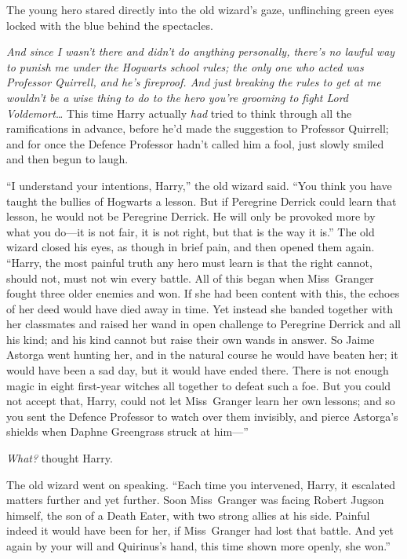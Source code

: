 The young hero stared directly into the old wizard’s gaze, unflinching green eyes locked with the blue behind the spectacles.

\emph{And since I wasn’t there and didn’t do anything personally, there’s no lawful way to punish me under the Hogwarts school rules; the only one who acted was Professor Quirrell, and he’s fireproof. And just breaking the rules to get at me wouldn’t be a wise thing to do to the hero you’re grooming to fight Lord Voldemort…} This time Harry actually \emph{had} tried to think through all the ramifications in advance, before he’d made the suggestion to Professor Quirrell; and for once the Defence Professor hadn’t called him a fool, just slowly smiled and then begun to laugh.

“I understand your intentions, Harry,” the old wizard said. “You think you have taught the bullies of Hogwarts a lesson. But if Peregrine Derrick could learn that lesson, he would not be Peregrine Derrick. He will only be provoked more by what you do—it is not fair, it is not right, but that is the way it is.” The old wizard closed his eyes, as though in brief pain, and then opened them again. “Harry, the most painful truth any hero must learn is that the right cannot, should not, must not win every battle. All of this began when Miss~Granger fought three older enemies and won. If she had been content with this, the echoes of her deed would have died away in time. Yet instead she banded together with her classmates and raised her wand in open challenge to Peregrine Derrick and all his kind; and his kind cannot but raise their own wands in answer. So Jaime Astorga went hunting her, and in the natural course he would have beaten her; it would have been a sad day, but it would have ended there. There is not enough magic in eight first-year witches all together to defeat such a foe. But you could not accept that, Harry, could not let Miss~Granger learn her own lessons; and so you sent the Defence Professor to watch over them invisibly, and pierce Astorga’s shields when Daphne Greengrass struck at him—”

\emph{What?} thought Harry.

The old wizard went on speaking. “Each time you intervened, Harry, it escalated matters further and yet further. Soon Miss~Granger was facing Robert Jugson himself, the son of a Death Eater, with two strong allies at his side. Painful indeed it would have been for her, if Miss~Granger had lost that battle. And yet again by your will and Quirinus’s hand, this time shown more openly, she won.”

